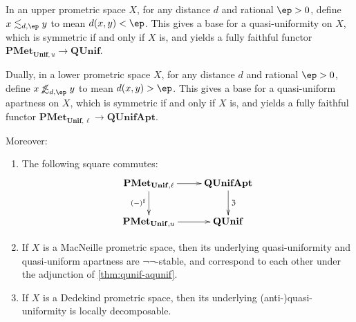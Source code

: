 \documentclass{article}
\def\upp#1{{#1}^{\sharp}}
\def\oapt{\mathrel{\!\not\,\not\lesssim}}
\def\leapx{\lesssim}
\def\ent#1{\leapx_{#1}}
\def\aent#1{\oapt_{#1}}
\def\neigh{\mathfrak{Z}}
\def\nn{\ensuremath{\neg\neg}}
\def\PMetUnifu{\mathbf{PMet}_{\mathbf{Unif},u}}
\def\PMetUnifl{\mathbf{PMet}_{\mathbf{Unif},\ell}}
\def\QUnif{\mathbf{QUnif}}
\def\QUnifApt{\mathbf{QUnifApt}}
\begin{document}
\begin{thm}\label{thm:pmet-unif}
  In an upper prometric space $X$, for any distance $d$ and rational $\ep>0$, define $x \ent{d,\ep} y$ to mean $d(x,y)<\ep$.
  This gives a base for a quasi-uniformity on $X$, which is symmetric if and only if $X$ is, and yields a fully faithful functor $\PMetUnifu \to \QUnif$.

  Dually, in a lower prometric space $X$, for any distance $d$ and rational $\ep>0$, define $x \aent{d,\ep} y$ to mean $d(x,y)>\ep$.
  This gives a base for a quasi-uniform apartness on $X$, which is symmetric if and only if $X$ is, and yields a fully faithful functor $\PMetUnifl \to \QUnifApt$.

  Moreover:
  \begin{enumerate}
  \item The following square commutes:
  \[ \xymatrix{ \PMetUnifl \ar[r] \ar[d]_{\upp{(-)}} & \QUnifApt \ar[d]^{\neigh} \\
    \PMetUnifu \ar[r] & \QUnif } \]
  \item If $X$ is a MacNeille prometric space, then its underlying quasi-uniformity and quasi-uniform apartness are \nn-stable, and correspond to each other under the adjunction of \cref{thm:qunif-aqunif}.
  \item If $X$ is a Dedekind prometric space, then its underlying (anti-)quasi-uniformity is locally decomposable.
  \end{enumerate}
\end{thm}
\end{document}
